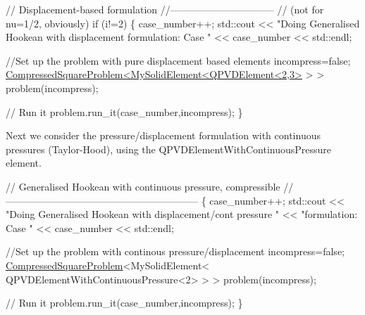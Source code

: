 \begin{DoxyCodeInclude}
    
    \textcolor{comment}{// Displacement-based formulation}
    \textcolor{comment}{//--------------------------------}
    \textcolor{comment}{// (not for nu=1/2, obviously)}
    \textcolor{keywordflow}{if} (i!=2) 
     \{
      case\_number++;
      std::cout 
       << \textcolor{stringliteral}{"Doing Generalised Hookean with displacement formulation: Case "}
       << case\_number << std::endl;
      
      \textcolor{comment}{//Set up the problem with pure displacement based elements}
      incompress=\textcolor{keyword}{false};
      \hyperlink{classCompressedSquareProblem}{CompressedSquareProblem<MySolidElement<QPVDElement<2,3>}
       > > 
       problem(incompress);
      
      \textcolor{comment}{// Run it}
      problem.run\_it(case\_number,incompress);
     \}

\end{DoxyCodeInclude}


Next we consider the pressure/displacement formulation with continuous pressures (Taylor-\/\+Hood), using the {\ttfamily Q\+P\+V\+D\+Element\+With\+Continuous\+Pressure} element.


\begin{DoxyCodeInclude}
    

    \textcolor{comment}{// Generalised Hookean with continuous pressure, compressible}
    \textcolor{comment}{//-----------------------------------------------------------}
    \{
     case\_number++;
     std::cout 
      << \textcolor{stringliteral}{"Doing Generalised Hookean with displacement/cont pressure "}
      << \textcolor{stringliteral}{"formulation: Case "} << case\_number << std::endl;     
     
     \textcolor{comment}{//Set up the problem with continous pressure/displacement}
     incompress=\textcolor{keyword}{false};
     \hyperlink{classCompressedSquareProblem}{CompressedSquareProblem}<MySolidElement<
      QPVDElementWithContinuousPressure<2> > > 
      problem(incompress); 
     
     \textcolor{comment}{// Run it}
     problem.run\_it(case\_number,incompress);
    \}

\end{DoxyCodeInclude}


